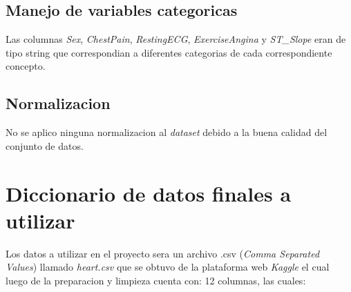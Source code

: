 \documentclass[12pt, letterpaper]{article}
\begin{document}
\subsection{Manejo de variables categoricas}
Las columnas \textit{Sex}, \textit{ChestPain}, \textit{RestingECG}, \textit{ExerciseAngina} y
\textit{ST\_Slope} eran de tipo string que correspondian a diferentes categorias de cada
correspondiente concepto. 

\subsection{Normalizacion}
No se aplico ninguna normalizacion al \textit{dataset} debido a la buena calidad del
conjunto de datos.

\section{Diccionario de datos finales a utilizar}
Los datos a utilizar en el proyecto sera un archivo .csv 
(\textit{Comma Separated Values}) llamado \textit{heart.csv} 
que se obtuvo de la plataforma web \textit{Kaggle} \cite{dataset}
el cual luego de la preparacion y limpieza cuenta con: 12 columnas, las cuales:
\end{document}
